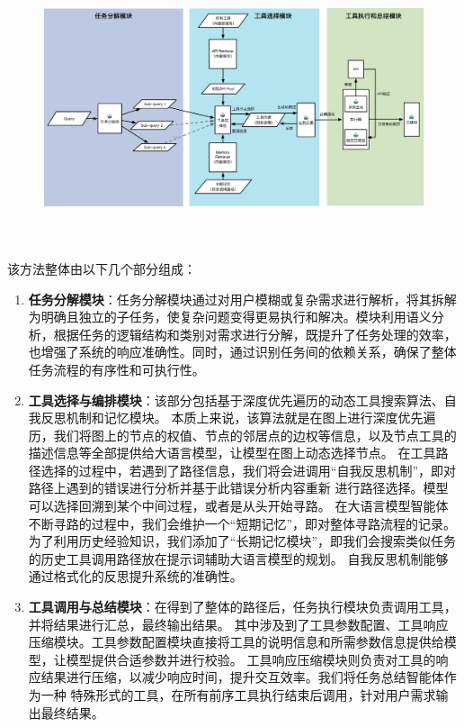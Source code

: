 \begin{figure}[!htp]
  \vspace{1em}
  \centering
  \setlength{\abovecaptionskip}{10pt} %
  \includegraphics[height=8cm]{../assets/ch4-整体框架图-3.pdf}
  \label{fig:ch4-framework}
\end{figure}

该方法整体由以下几个部分组成：

\begin{enumerate}
  \item \textbf{任务分解模块}：任务分解模块通过对用户模糊或复杂需求进行解析，将其拆解为明确且独立的子任务，使复杂问题变得更易执行和解决。模块利用语义分析，根据任务的逻辑结构和类别对需求进行分解，既提升了任务处理的效率，也增强了系统的响应准确性。同时，通过识别任务间的依赖关系，确保了整体任务流程的有序性和可执行性。
  \item \textbf{工具选择与编排模块}：该部分包括基于深度优先遍历的动态工具搜索算法、自我反思机制和记忆模块。
  本质上来说，该算法就是在图上进行深度优先遍历，我们将图上的节点的权值、节点的邻居点的边权等信息，以及节点工具的描述信息等全部提供给大语言模型，让模型在图上动态选择节点。
  在工具路径选择的过程中，若遇到了路径信息，我们将会进调用“自我反思机制”，即对路径上遇到的错误进行分析并基于此错误分析内容重新
  进行路径选择。模型可以选择回溯到某个中间过程，或者是从头开始寻路。
  在大语言模型智能体不断寻路的过程中，我们会维护一个“短期记忆”，即对整体寻路流程的记录。
  为了利用历史经验知识，我们添加了“长期记忆模块”，即我们会搜索类似任务的历史工具调用路径放在提示词辅助大语言模型的规划。
  自我反思机制能够通过格式化的反思提升系统的准确性。
  \item \textbf{工具调用与总结模块}：在得到了整体的路径后，任务执行模块负责调用工具，并将结果进行汇总，最终输出结果。
  其中涉及到了工具参数配置、工具响应压缩模块。工具参数配置模块直接将工具的说明信息和所需参数信息提供给模型，让模型提供合适参数并进行校验。
  工具响应压缩模块则负责对工具的响应结果进行压缩，以减少响应时间，提升交互效率。我们将任务总结智能体作为一种
  特殊形式的工具，在所有前序工具执行结束后调用，针对用户需求输出最终结果。
\end{enumerate}

